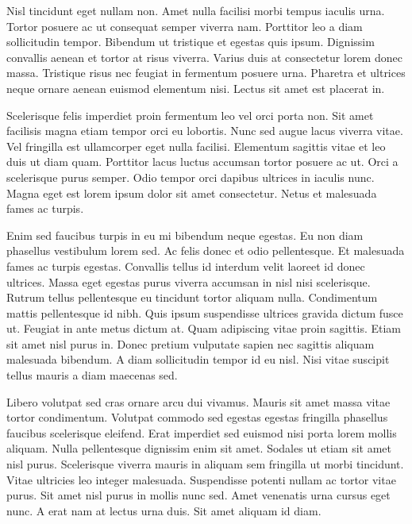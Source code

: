 \documentclass[]{tufte-handout}
\begin{document}
Nisl tincidunt eget nullam non. Amet nulla facilisi morbi tempus iaculis
urna. Tortor posuere ac ut consequat semper viverra nam. Porttitor leo a
diam sollicitudin tempor. Bibendum ut tristique et egestas quis ipsum.
Dignissim convallis aenean et tortor at risus viverra. Varius duis at
consectetur lorem donec massa. Tristique risus nec feugiat in fermentum
posuere urna. Pharetra et ultrices neque ornare aenean euismod elementum
nisi. Lectus sit amet est placerat in.


Scelerisque felis imperdiet proin fermentum leo vel orci porta non. Sit
amet facilisis magna etiam tempor orci eu lobortis. Nunc sed augue lacus
viverra vitae. Vel fringilla est ullamcorper eget nulla facilisi.
Elementum sagittis vitae et leo duis ut diam quam. Porttitor lacus
luctus accumsan tortor posuere ac ut. Orci a scelerisque purus semper.
Odio tempor orci dapibus ultrices in iaculis nunc. Magna eget est lorem
ipsum dolor sit amet consectetur. Netus et malesuada fames ac turpis.

Enim sed faucibus turpis in eu mi bibendum neque egestas. Eu non diam
phasellus vestibulum lorem sed. Ac felis donec et odio pellentesque. Et
malesuada fames ac turpis egestas. Convallis tellus id interdum velit
laoreet id donec ultrices. Massa eget egestas purus viverra accumsan in
nisl nisi scelerisque. Rutrum tellus pellentesque eu tincidunt tortor
aliquam nulla. Condimentum mattis pellentesque id nibh. Quis ipsum
suspendisse ultrices gravida dictum fusce ut. Feugiat in ante metus
dictum at. Quam adipiscing vitae proin sagittis. Etiam sit amet nisl
purus in. Donec pretium vulputate sapien nec sagittis aliquam malesuada
bibendum. A diam sollicitudin tempor id eu nisl. Nisi vitae suscipit
tellus mauris a diam maecenas sed.

Libero volutpat sed cras ornare arcu dui vivamus. Mauris sit amet massa
vitae tortor condimentum. Volutpat commodo sed egestas egestas fringilla
phasellus faucibus scelerisque eleifend. Erat imperdiet sed euismod nisi
porta lorem mollis aliquam. Nulla pellentesque dignissim enim sit amet.
Sodales ut etiam sit amet nisl purus. Scelerisque viverra mauris in
aliquam sem fringilla ut morbi tincidunt. Vitae ultricies leo integer
malesuada. Suspendisse potenti nullam ac tortor vitae purus. Sit amet
nisl purus in mollis nunc sed. Amet venenatis urna cursus eget nunc. A
erat nam at lectus urna duis. Sit amet aliquam id diam.
\end{document}
